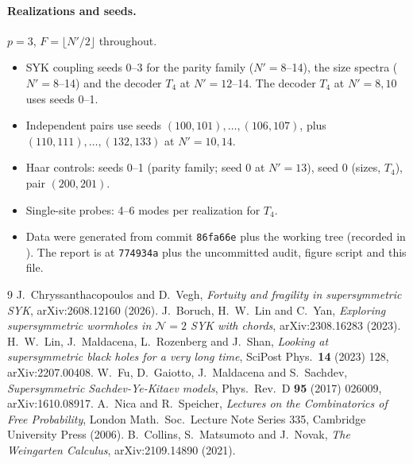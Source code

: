 \documentclass[11pt]{article}
\newcommand{\Np}{N'}
\theoremstyle{remark}
\begin{document}
\paragraph{Realizations and seeds.} $p=3$, $F=\lfloor\Np/2\rfloor$ throughout.
\begin{itemize}\itemsep1pt
\item SYK coupling seeds 0--3 for the parity family ($\Np=8$--14), the size spectra ($\Np=8$--14) and the decoder
  $T_4$ at $\Np=12$--14. The decoder $T_4$ at $\Np=8,10$ uses seeds 0--1.
\item Independent pairs use seeds $(100,101),\ldots,(106,107)$, plus $(110,111),\ldots,(132,133)$ at $\Np=10,14$.
\item Haar controls: seeds 0--1 (parity family; seed 0 at $\Np=13$), seed 0 (sizes, $T_4$), pair $(200,201)$.
\item Single-site probes: 4--6 modes per realization for $T_4$.
\item Data were generated from commit \texttt{86fa66e} plus the working tree (recorded in ). The
  report is at \texttt{774934a} plus the uncommitted audit, figure script and this file.
\end{itemize}

\begin{thebibliography}{9}\small
{} J.~Chryssanthacopoulos and D.~Vegh, \emph{Fortuity and fragility in supersymmetric SYK}, arXiv:2608.12160 (2026).
 J.~Boruch, H.~W.~Lin and C.~Yan, \emph{Exploring supersymmetric wormholes in $\mathcal N=2$ SYK with chords}, arXiv:2308.16283 (2023).
 H.~W.~Lin, J.~Maldacena, L.~Rozenberg and J.~Shan, \emph{Looking at supersymmetric black holes for a very long time}, SciPost Phys.\ \textbf{14} (2023) 128, arXiv:2207.00408.
 W.~Fu, D.~Gaiotto, J.~Maldacena and S.~Sachdev, \emph{Supersymmetric Sachdev-Ye-Kitaev models}, Phys.\ Rev.\ D \textbf{95} (2017) 026009, arXiv:1610.08917.
 A.~Nica and R.~Speicher, \emph{Lectures on the Combinatorics of Free Probability}, London Math.\ Soc.\ Lecture Note Series 335, Cambridge University Press (2006).
 B.~Collins, S.~Matsumoto and J.~Novak, \emph{The Weingarten Calculus}, arXiv:2109.14890 (2021).
\end{thebibliography}
\end{document}
